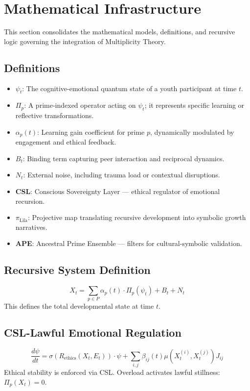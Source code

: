 \documentclass[11pt]{article}
\begin{document}
\section{Mathematical Infrastructure}
This section consolidates the mathematical models, definitions, and recursive logic governing the integration of Multiplicity Theory.


\subsection{Definitions}
\begin{itemize}
\item \textbf{$\psi_t$}: The cognitive-emotional quantum state of a youth participant at time $t$.
\item \textbf{$\Pi_p$}: A prime-indexed operator acting on $\psi_t$; it represents specific learning or reflective transformations.
\item \textbf{$\alpha_p(t)$}: Learning gain coefficient for prime $p$, dynamically modulated by engagement and ethical feedback.
\item \textbf{$B_t$}: Binding term capturing peer interaction and reciprocal dynamics.
\item \textbf{$N_t$}: External noise, including trauma load or contextual disruptions.
\item \textbf{CSL}: Conscious Sovereignty Layer — ethical regulator of emotional recursion.
\item \textbf{$\pi_{\text{L\={i}la}}$}: Projective map translating recursive development into symbolic growth narratives.
\item \textbf{APE}: Ancestral Prime Ensemble — filters for cultural-symbolic validation.
\end{itemize}


\subsection{Recursive System Definition}
\[ X_t = \sum_{p \in P} \alpha_p(t) \cdot \Pi_p(\psi_t) + B_t + N_t \]
This defines the total developmental state at time $t$.


\subsection{CSL-Lawful Emotional Regulation}
\[ \frac{d\psi}{dt} = \sigma(R_{\text{ethics}}(X_t, E_t)) \cdot \psi + \sum_{i,j} \beta_{ij}(t) \mu(X_t^{(i)}, X_t^{(j)}) J_{ij} \]
Ethical stability is enforced via CSL. Overload activates lawful stillness: $\Pi_p(X_t)=0$.
\end{document}
